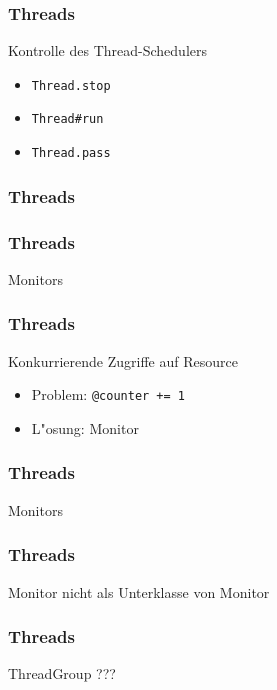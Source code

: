 \documentclass{beamer}
\begin{document}
\begin{frame}
  \frametitle{Threads}
  Kontrolle des Thread-Schedulers
  \begin{itemize}
    \item \texttt{Thread.stop} 
    \item \texttt{Thread\#run}
    \item \texttt{Thread.pass}
  \end{itemize}
\end{frame}

\begin{frame}
  \frametitle{Threads}
  
\end{frame}

\begin{frame}
  \frametitle{Threads}
  Monitors
  
\end{frame}

\begin{frame}
  \frametitle{Threads}
  Konkurrierende Zugriffe auf Resource
  \begin{itemize}
    \item Problem: \texttt{@counter += 1}\\
    \pause
    \item L"osung: Monitor
  \end{itemize}
\end{frame}

\begin{frame}
  \frametitle{Threads}
  Monitors
  
\end{frame}

\begin{frame}
  \frametitle{Threads}
  Monitor nicht als Unterklasse von Monitor
  
\end{frame}

\begin{frame}
  \frametitle{Threads}
  ThreadGroup ???
\end{frame}

\end{document}
